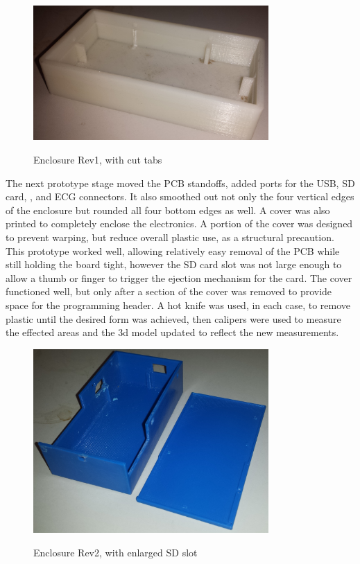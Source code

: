 \begin{figure}[ht]
 \begin{center}
  \label{fig:enclosure1}
  \includegraphics[scale=1,width=0.8\textwidth]{Images/Enclosure1.png} 
  \caption{Enclosure Rev1, with cut tabs}
 
 \end{center}
\end{figure}


The next prototype stage moved the PCB standoffs, added ports for the USB, SD card, , and ECG connectors. It also smoothed out not only the four vertical edges of the enclosure but rounded all four bottom edges as well. A cover was also printed to completely enclose the electronics. A portion of the cover was designed to prevent warping, but reduce overall plastic use, as a structural precaution. This prototype worked well, allowing relatively easy removal of the PCB while still holding the board tight, however the SD card slot was not large enough to allow a thumb or finger to trigger the ejection mechanism for the card. The cover functioned well, but only after a section of the cover was removed to provide space for the programming header.  A hot knife was used, in each case, to remove plastic until the desired form was achieved, then calipers were used to measure the effected areas and the 3d model updated to reflect the new measurements.
\begin{figure}[ht]
 \begin{center}
  \label{fig:enclosure2}
  \includegraphics[scale=1,width=0.8\textwidth]{Images/Enclosure2.png} 
  \caption{Enclosure Rev2, with enlarged SD slot}
 
 \end{center}
\end{figure}


